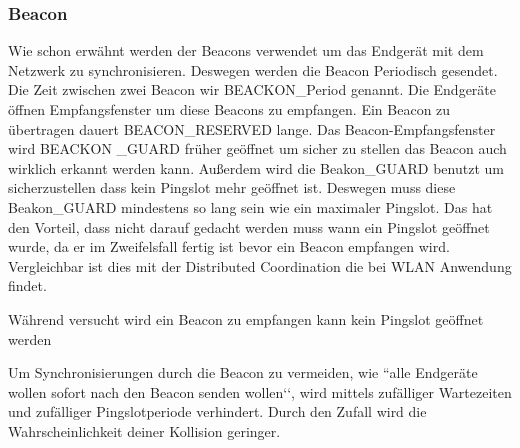 \documentclass[a4paper,12pt]{article}
\begin{document}
            \subsubsection{Beacon}
                Wie schon erwähnt werden der Beacons verwendet um das Endgerät mit dem Netzwerk zu synchronisieren. 
                Deswegen werden die Beacon Periodisch gesendet. Die Zeit zwischen zwei Beacon wir BEACKON\_Period 
                genannt. Die Endgeräte öffnen Empfangsfenster um diese Beacons zu empfangen. Ein Beacon zu übertragen 
                dauert BEACON\_RESERVED lange. Das Beacon-Empfangsfenster wird BEACKON \_GUARD früher geöffnet um 
                sicher zu stellen das Beacon auch wirklich erkannt werden kann. Außerdem wird die Beakon\_GUARD 
                benutzt um sicherzustellen dass kein Pingslot mehr geöffnet ist. Deswegen muss diese Beakon\_GUARD 
                mindestens so lang sein wie ein maximaler Pingslot. Das hat den Vorteil, dass nicht darauf gedacht 
                werden muss wann ein Pingslot geöffnet wurde, da er im Zweifelsfall fertig ist bevor ein Beacon 
                empfangen wird. Vergleichbar ist dies mit der Distributed Coordination die bei WLAN Anwendung findet.

                Während versucht wird ein Beacon zu empfangen kann kein Pingslot geöffnet werden
                
                Um Synchronisierungen durch die Beacon zu vermeiden, wie ``alle Endgeräte wollen sofort nach den 
                Beacon senden wollen‘‘, wird mittels zufälliger Wartezeiten und zufälliger Pingslotperiode verhindert. 
                Durch den Zufall wird die Wahrscheinlichkeit deiner Kollision geringer.
\end{document}
